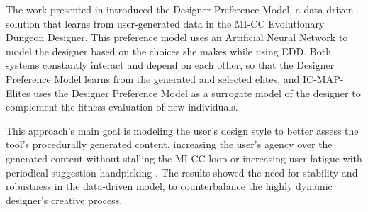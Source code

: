 The work presented in  introduced the Designer Preference Model, a data-driven solution that learns from user-generated data in the MI-CC Evolutionary Dungeon Designer. This preference model uses an Artificial Neural Network to model the designer based on the choices she makes while using EDD. Both systems constantly interact and depend on each other, so that the Designer Preference Model learns from the generated and selected elites, and IC-MAP-Elites uses the Designer Preference Model as a surrogate model of the designer to complement the fitness evaluation of new individuals. 

This approach's main goal is modeling the user's design style to better assess the tool's procedurally generated content, increasing the user's agency over the generated content without stalling the MI-CC loop  or increasing user fatigue with periodical suggestion handpicking . The results showed the need for stability and robustness in the data-driven model, to counterbalance the highly dynamic designer's creative process. 

